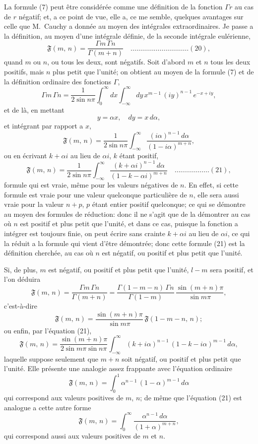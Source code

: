 \documentclass[11pt,a4paper]{book}
\begin{document}
La formule (7) peut \^etre consid\'er\'ee comme une d\'efinition de la fonction $\Gamma r$ au cas de $r$ n\'egatif; et, a ce point de vue, elle a, ce me semble, quelques avantages sur celle que M.~Cauchy a donn\'ee au moyen des int\'egrales extraordinaires. Je passe a la d\'efinition, au moyen d'une int\'egrale d\'efinie, de la seconde int\'egrale eul\'erienne,
\[
\mathfrak{F}(m,\, n) = \frac{\Gamma m \, \Gamma n}{\Gamma(m + n)} \quad \ldots \ldots \ldots \ldots \ldots \ldots \ldots \ldots \ldots \ldots (20),
\]
quand $m$ ou $n$, ou tous les deux, sont n\'egatifs. Soit d'abord $m$ et $n$ tous les deux positifs, mais $n$ plus petit que l'unit\'e; on obtient au moyen de la formule (7) et de la d\'efinition ordinaire des fonctions $\Gamma$,
\[
\Gamma m \, \Gamma n = \frac{1}{2\sin n\pi} \int_0^{\infty} dx \int_{-\infty}^{\infty} dy \, x^{m-1}\, (iy)^{n-1}\, e^{-x+iy},
\]
et de l\`a, en mettant
\[
y = \alpha x, \quad dy = x\, d\alpha,
\]
et int\'egrant par rapport a $x$,
\[
\mathfrak{F}(m,\, n) = \frac{1}{2\sin n\pi} \int_{-\infty}^{\infty} \frac{(i\alpha)^{n-1}\, d\alpha}{(1 - i\alpha)^{m+n}},
\]
ou en \'ecrivant $k + \alpha i$ au lieu de $\alpha i$, $k$ \'etant positif,
\[
\mathfrak{F}(m,\, n) = \frac{1}{2\sin n\pi} \int_{-\infty}^{\infty} \frac{(k + \alpha i)^{n-1}\, d\alpha}{(1 - k - \alpha i)^{m+n}} \quad \ldots \ldots \ldots \ldots \ldots \ldots (21),
\]
formule qui est vraie, m\^eme pour les valeurs n\'egatives de $n$. En effet, si cette formule est vraie pour une valeur quelconque particuli\`ere de $n$, elle sera aussi vraie pour la valeur $n + p$, $p$ \'etant entier positif quelconque; ce qui se d\'emontre au moyen des formules de r\'eduction: donc il ne s'agit que de la d\'emontrer au cas o\`u $n$ est positif et plus petit que l'unit\'e, et dans ce cas, puisque la fonction a int\'egrer est toujours finie, on peut \'ecrire sans crainte $k + \alpha i$ au lieu de $\alpha i$, ce qui la r\'eduit a la formule qui vient d'\^etre d\'emontr\'ee; donc cette formule (21) est la d\'efinition cherch\'ee, au cas o\`u $n$ est n\'egatif, ou positif et plus petit que l'unit\'e.

Si, de plus, $m$ est n\'egatif, ou positif et plus petit que l'unit\'e, $l - m$ sera positif, et l'on d\'eduira
\[
\mathfrak{F}(m,\, n) = \frac{\Gamma m \, \Gamma n}{\Gamma(m+n)} = \frac{\Gamma(1 - m - n)\, \Gamma n}{\Gamma(1 - m)} \, \frac{\sin(m+n)\pi}{\sin m\pi},
\]
c'est-\`a-dire
\[
\mathfrak{F}(m,\, n) = \frac{\sin(m+n)\pi}{\sin m\pi} \, \mathfrak{F}(1 - m - n,\, n);
\]
ou enfin, par l'\'equation (21),
\[
\mathfrak{F}(m,\, n) = \frac{\sin(m+n)\pi}{2\sin m\pi \sin n\pi} \int_{-\infty}^{\infty} (k + i\alpha)^{n-1}\,(1 - k - i\alpha)^{m-1}\, d\alpha,
\]
laquelle suppose seulement que $m + n$ soit n\'egatif, ou positif et plus petit que l'unit\'e. Elle pr\'esente une analogie assez frappante avec l'\'equation ordinaire
\[
\mathfrak{F}(m,\, n) = \int_0^1 \alpha^{n-1}\,(1 - \alpha)^{m-1}\, d\alpha
\]
qui correspond aux valeurs positives de $m$, $n$; de m\^eme que l'\'equation (21) est analogue a cette autre forme
\[
\mathfrak{F}(m,\, n) = \int_0^{\infty} \frac{\alpha^{n-1}\, d\alpha}{(1 + \alpha)^{m+n}},
\]
qui correspond aussi aux valeurs positives de $m$ et $n$.
\end{document}
